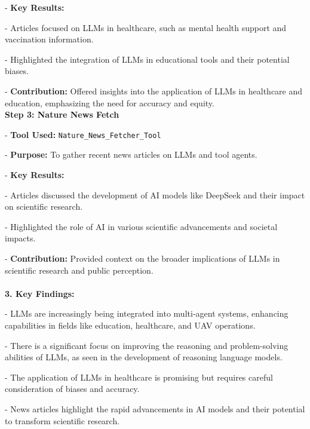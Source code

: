 \begin{answerbox}
\quad\quad- \textbf{Key Results:}

\quad\quad\quad - Articles focused on LLMs in healthcare, such as mental health support and vaccination information.

\quad\quad\quad - Highlighted the integration of LLMs in educational tools and their potential biases.

\quad\quad - \textbf{Contribution:} Offered insights into the application of LLMs in healthcare and education, emphasizing the need for accuracy and equity.\\

\quad \textbf{Step 3: Nature News Fetch}

\quad\quad - \textbf{Tool Used:} \texttt{Nature\_News\_Fetcher\_Tool}

\quad\quad - \textbf{Purpose:} To gather recent news articles on LLMs and tool agents.

\quad\quad - \textbf{Key Results:} 

\quad\quad\quad - Articles discussed the development of AI models like DeepSeek and their impact on scientific research.
  
\quad\quad\quad - Highlighted the role of AI in various scientific advancements and societal impacts.
  
\quad\quad - \textbf{Contribution:} Provided context on the broader implications of LLMs in scientific research and public perception.
\\\\
\textbf{3. Key Findings:}

\quad - LLMs are increasingly being integrated into multi-agent systems, enhancing capabilities in fields like education, healthcare, and UAV operations.

\quad - There is a significant focus on improving the reasoning and problem-solving abilities of LLMs, as seen in the development of reasoning language models.

\quad - The application of LLMs in healthcare is promising but requires careful consideration of biases and accuracy.

\quad - News articles highlight the rapid advancements in AI models and their potential to transform scientific research.
\end{answerbox}


